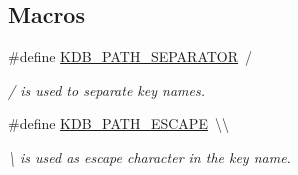 \subsection*{Macros}
\begin{DoxyCompactItemize}
\item 
\#define \hyperlink{group__key_gad19f92d6d37dc439d1727ca10263c9cc}{K\+D\+B\+\_\+\+P\+A\+T\+H\+\_\+\+S\+E\+P\+A\+R\+A\+T\+OR}~\textquotesingle{}/\textquotesingle{}
\begin{DoxyCompactList}\small\item\em {\ttfamily /} is used to separate key names. \end{DoxyCompactList}\item 
\#define \hyperlink{group__key_ga6d24980bc81c4276367f4e80725a8b61}{K\+D\+B\+\_\+\+P\+A\+T\+H\+\_\+\+E\+S\+C\+A\+PE}~\textquotesingle{}\textbackslash{}\textbackslash{}\textquotesingle{}
\begin{DoxyCompactList}\small\item\em {\ttfamily \textbackslash{}} is used as escape character in the key name. \end{DoxyCompactList}\end{DoxyCompactItemize}
